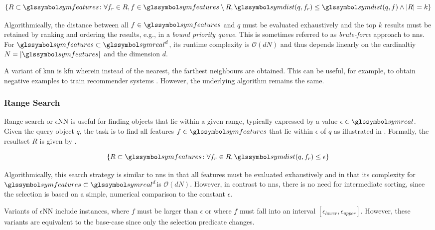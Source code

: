 \begin{equation}
    \label{eq:knn}
    \lbrace R \subset \symfeatures \colon \forall f_r \in R, f \in \symfeatures \setminus R, \symdist(q,f_r) \leq \symdist(q,f) \wedge |R| = k \rbrace
\end{equation}

Algorithmically, the distance between all $f \in \symfeatures$ and $q$ must be evaluated exhaustively and the top $k$ results must be retained by ranking and ordering the results, e.g., in a \emph{bound priority queue}. This is sometimes referred to as \emph{brute-force} approach to \acrshort{nns}. For $\symfeatures \subset \symreal^d$, its runtime complexity is $\mathcal{O}(dN)$ and thus depends linearly on the cardinaltiy $N = |\symfeatures|$ and the dimension $d$. 

A variant of \acrshort{knn} is \acrfull{kfn} wherein instead of the nearest, the farthest neighbours are obtained. This can be useful, for example, to obtain negative examples to train recommender systems \cite{Pagh:2015Approximate}. However, the underlying algorithm remains the same.

\subsubsection{Range Search}

Range search or $\epsilon$NN is useful for finding objects that lie within a given range, typically expressed by a value $\epsilon \in \symreal$. Given the query object $q$, the task is to find all features $f \in \symfeatures$ that lie within $\epsilon$ of $q$ as illustrated in . Formally, the resultset $R$ is given by .

\begin{equation}
    \label{eq:epsilonnn}
    \lbrace R \subset \symfeatures \colon \forall f_r \in R, \symdist(q,f_r) \leq \epsilon \rbrace
\end{equation}

Algorithmically, this search strategy is similar to \acrshort{nns} in that all features must be evaluated exhaustively and in that its complexity for $\symfeatures \subset \symreal^d$is $\mathcal{O}(dN)$. However, in contrast to \acrshort{nns}, there is no need for intermediate sorting, since the selection is based on a simple, numerical comparison to the constant $\epsilon$.

Variants of $\epsilon$NN include instances, where $f$ must be larger than $\epsilon$ or where $f$ must fall into an interval $[ \epsilon_{lower}, \epsilon_{upper} ]$. However, these variants are equivalent to the base-case since only the selection predicate changes.

